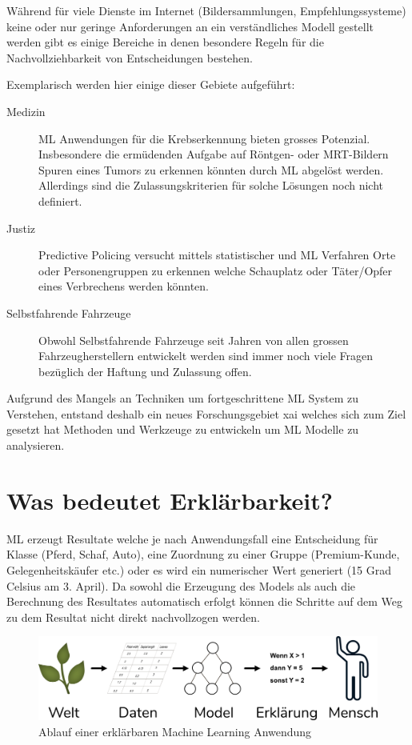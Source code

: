 \documentclass[
  12pt, %
  a4paper, %
  oneside, %
  openany, 
  numbers=noenddot, %
  BCOR=5mm, %
  parskip=half*, %
  thesis, %
]{bfhbook}
\begin{document}
Während für viele Dienste im Internet (Bildersammlungen, Empfehlungssysteme) keine oder nur geringe Anforderungen an ein verständliches Modell gestellt werden gibt es einige Bereiche in denen besondere Regeln für die Nachvollziehbarkeit von Entscheidungen bestehen.

 Exemplarisch werden hier einige dieser Gebiete aufgeführt:

\begin{description}
  \item[Medizin] \gls{ML} Anwendungen für die Krebserkennung bieten grosses Potenzial. Insbesondere die ermüdenden Aufgabe auf Röntgen- oder MRT-Bildern Spuren eines Tumors zu erkennen könnten durch \gls{ML} abgelöst werden. Allerdings sind die Zulassungskriterien für solche Lösungen noch nicht definiert.
  \item[Justiz] Predictive Policing versucht mittels statistischer und \gls{ML} Verfahren Orte oder Personengruppen zu erkennen welche  Schauplatz oder Täter/Opfer eines Verbrechens werden könnten.
  \item[Selbstfahrende Fahrzeuge] Obwohl Selbstfahrende Fahrzeuge seit Jahren von allen grossen Fahrzeugherstellern entwickelt werden sind immer noch viele Fragen bezüglich der Haftung und Zulassung offen.
\end{description}

Aufgrund des Mangels an Techniken um fortgeschrittene \gls{ML} System zu Verstehen, entstand deshalb ein neues Forschungsgebiet \acrfull{xai} welches sich zum Ziel gesetzt hat Methoden und Werkzeuge zu entwickeln um \gls{ML} Modelle zu analysieren.

\chapter{Was bedeutet Erklärbarkeit?}
\gls{ML} erzeugt Resultate welche je nach Anwendungsfall eine Entscheidung für Klasse (Pferd, Schaf, Auto), eine Zuordnung zu einer Gruppe (Premium-Kunde, Gelegenheitskäufer etc.) oder es wird ein numerischer Wert generiert (15 Grad Celsius am 3. April). 
Da sowohl die Erzeugung des Models als auch die Berechnung des Resultates automatisch erfolgt können die Schritte auf dem Weg zu dem Resultat nicht direkt nachvollzogen werden.

\begin{figure}[ht]
\centering
\includegraphics[width=\textwidth]{Bilder/Explanation-Flow.png}
\caption{Ablauf einer erklärbaren Machine Learning Anwendung}
\end{figure}
\end{document}
